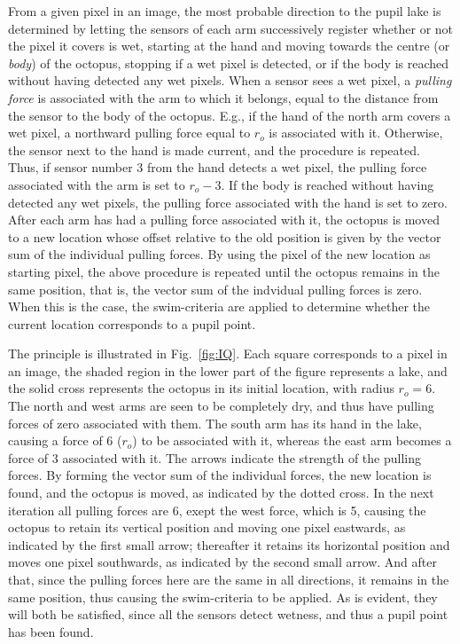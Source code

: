 
From a given pixel in an image, the most probable direction to the
pupil lake is determined by letting the sensors of each arm
successively register whether or not the pixel it covers is wet,
starting at the hand and moving towards the centre (or {\em body\/})
of the octopus, stopping if a wet pixel is detected, or if the body is
reached without having detected any wet pixels.  When a sensor sees a
wet pixel, a {\em pulling force\/} is associated with the arm to which
it belongs, equal to the distance from the sensor to the body of the
octopus.  E.g., if the hand of the north arm covers a wet pixel, a
northward pulling force equal to $r_{o}$ is associated with it.
Otherwise, the sensor next to the hand is made current, and the
procedure is repeated.  Thus, if sensor number 3 from the hand detects
a wet pixel, the pulling force associated with the arm is set to
$r_{o}-3$.  If the body is reached without having detected any wet
pixels, the pulling force associated with the hand is set to zero.
After each arm has had a pulling force associated with it, the octopus
is moved to a new location whose offset relative to the old position
is given by the vector sum of the individual pulling forces.  By using
the pixel of the new location as starting pixel, the above procedure
is repeated until the octopus remains in the same position, that is,
the vector sum of the indvidual pulling forces is zero.  When this is
the case, the swim-criteria are applied to determine whether the
current location corresponds to a pupil point.

The principle is illustrated in Fig.~\ref{fig:IQ}.  Each square
corresponds to a pixel in an image, the shaded region in the lower
part of the figure represents a lake, and the solid cross represents
the octopus in its initial location, with radius $r_{o}=6$.  The north
and west arms are seen to be completely dry, and thus have pulling
forces of zero associated with them.  The south arm has its hand in
the lake, causing a force of 6 ($r_{o}$) to be associated with it,
whereas the east arm becomes a force of 3 associated with it.  The
arrows indicate the strength of the pulling forces.  By forming the
vector sum of the individual forces, the new location is found, and
the octopus is moved, as indicated by the dotted cross.  In the next
iteration all pulling forces are 6, exept the west force, which is 5,
causing the octopus to retain its vertical position and moving one
pixel eastwards, as indicated by the first small arrow; thereafter it
retains its horizontal position and moves one pixel southwards, as
indicated by the second small arrow.  And after that, since the
pulling forces here are the same in all directions, it remains in the
same position, thus causing the swim-criteria to be applied.  As is
evident, they will both be satisfied, since all the sensors detect
wetness, and thus a pupil point has been found.

